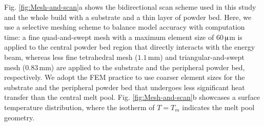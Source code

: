 \documentclass [11pt, proquest] {uwthesis}[2020/02/24]
\begin{document}
Fig. \ref{fig:Mesh-and-scan}a shows the bidirectional scan scheme
used in this study and the whole build with a substrate and a thin
layer of powder bed. Here, we use a selective meshing scheme to balance
model accuracy with computation time: a fine quad-and-swept mesh with
a maximum element size of $60\,$$\muup$m is applied to the central
powder bed region that directly interacts with the energy beam, whereas
less fine tetrahedral mesh ($1.1\,\text{mm}$) and triangular-and-swept
mesh ($0.83\,\text{mm}$) are applied to the substrate and the peripheral
powder bed, respectively. We adopt the FEM practice to use coarser element sizes for the substrate and the peripheral powder bed that undergoes less significant heat transfer than the central melt pool. Fig. \ref{fig:Mesh-and-scan}b showcases
a surface temperature distribution, where the isotherm of $T=T_{m}$
indicates the melt pool geometry.
\end{document}
